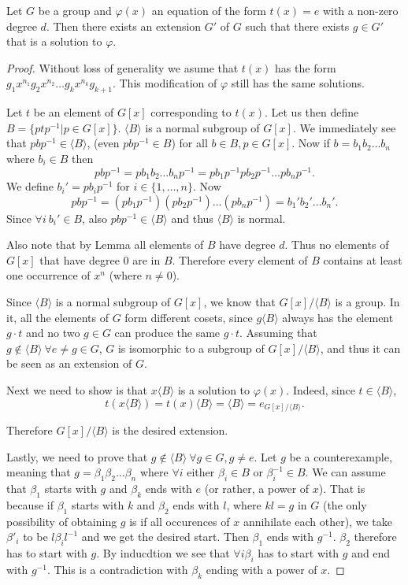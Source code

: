\begin{thm}
	Let $G$ be a group and $\varphi(x)$ an equation of the form $t(x)=e$ with a non-zero degree $d$. Then there exists an extension $G'$ of $G$ such that there exists $g\in G'$ that is a solution to $\varphi$.
\end{thm}
\begin{proof}
Without loss of generality we asume that $t(x)$ has the form $g_1 x^{n_1}g_2 x^{n_2}\dots g_k x^{n_k}g_{k+1}$. This modification of $\varphi$ still has the same solutions.

Let $t$ be an element of $G[x]$ corresponding to $t(x)$. Let us then define $B=\{ptp^{-1}|p\in G[x]\}$. $\langle B\rangle$ is a normal subgroup of $G[x]$. We immediately see that $pbp^{-1}\in \langle B\rangle$, (even $pbp^{-1}\in B$) for all $b\in B, p\in G[x]$. Now if $b=b_1 b_2\dots b_n$ where $b_i\in B$ then $$pbp^{-1}=pb_1 b_2\dots b_np^{-1}=pb_1p^{-1}p b_2p^{-1}\dots pb_np^{-1}.$$
We define ${b_i}'=pb_ip^{-1}$ for $i\in\{1,\dots,n\}$. Now $$pbp^{-1}=(pb_1p^{-1})(p b_2p^{-1})\dots (pb_np^{-1})={b_1}'{b_2}'\dots{b_n}'.$$
Since $\forall i\ {b_i}'\in B$, also $pbp^{-1}\in \langle B\rangle$ and thus $\langle B \rangle$ is normal.

Also note that by Lemma  all elements of $B$ have degree $d$. Thus no elements of $G[x]$ that have degree 0 are in $B$. Therefore every element of $B$ contains at least one occurrence of $x^n$ (where $n\neq 0$). 

Since $\langle B \rangle$ is a normal subgroup of $G[x]$, we know that $G[x]/\langle B \rangle$ is a group. In it, all the elements of $G$ form different cosets, since $g\langle B \rangle$ always has the element $g\cdot t$ and no two $g\in G$ can produce the same $g\cdot t$. Assuming that $g\notin \langle B \rangle\ \forall e\neq g\in G$, $G$ is isomorphic to a subgroup of $G[x]/\langle B \rangle$, and thus it can be seen as an extension of $G$.

Next we need to show is that $x \langle B \rangle$ is a solution to $\varphi(x)$. Indeed, since $t\in\langle B \rangle$, $$t(x\langle B \rangle)=t(x)\langle B \rangle=\langle B \rangle=e_{G[x]/\langle B \rangle}.$$

Therefore $G[x]/\langle B \rangle$ is the desired extension.

Lastly, we need to prove that $g\notin \langle B \rangle\ \forall g\in G, g\neq e$. Let $g$ be a counterexample, meaning that $g=\beta_1\beta_2\dots \beta_n$ where $\forall i$ either $\beta_i\in B$ or $\beta_i^{-1}\in B$. We can assume that $\beta_1$ starts with $g$ and $\beta_k$ ends with $e$ (or rather, a power of $x$). That is because if $\beta_1$ starts with $k$ and $\beta_2$ ends with $l$, where $kl=g$ in $G$ (the only possibility of obtaining $g$ is if all occurences of $x$ annihilate each other), we take $\beta'_i$ to be $l\beta_il^{-1}$ and we get the desired start. Then $\beta_1$ ends with $g^{-1}$. $\beta_2$ therefore has to start with $g$. By inducdtion we see that $\forall i \beta_i$ has to start with $g$ and end with $g^{-1}$. This is a contradiction with $\beta_k$ ending with a power of $x$.
\end{proof}

